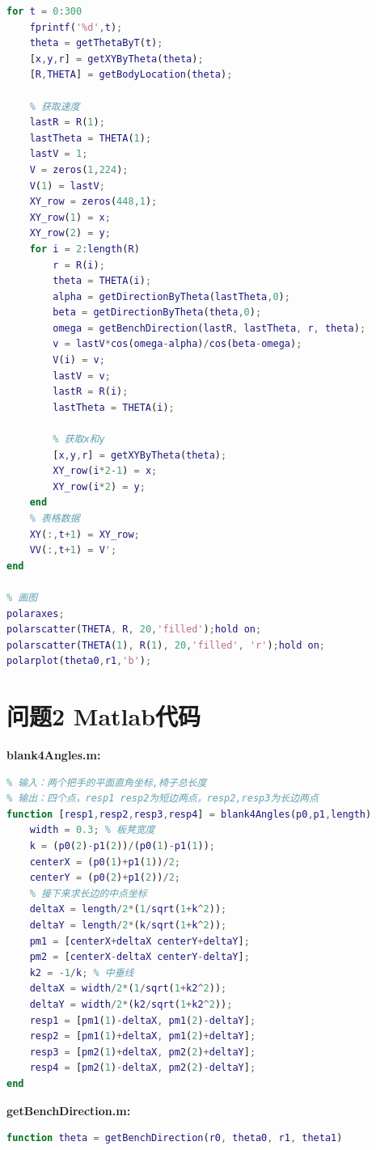 \documentclass[withoutpreface,bwprint]{cumcmthesis} %
\begin{document}
\begin{appendices}
\begin{lstlisting}[language=matlab]
for t = 0:300
    fprintf('%d',t);
    theta = getThetaByT(t);
    [x,y,r] = getXYByTheta(theta);
    [R,THETA] = getBodyLocation(theta);

    % 获取速度
    lastR = R(1);
    lastTheta = THETA(1);
    lastV = 1;
    V = zeros(1,224);
    V(1) = lastV;
    XY_row = zeros(448,1);
    XY_row(1) = x;
    XY_row(2) = y;
    for i = 2:length(R)
        r = R(i);
        theta = THETA(i);
        alpha = getDirectionByTheta(lastTheta,0);
        beta = getDirectionByTheta(theta,0);
        omega = getBenchDirection(lastR, lastTheta, r, theta);
        v = lastV*cos(omega-alpha)/cos(beta-omega);
        V(i) = v;
        lastV = v;
        lastR = R(i);
        lastTheta = THETA(i);
        
        % 获取x和y
        [x,y,r] = getXYByTheta(theta);
        XY_row(i*2-1) = x;
        XY_row(i*2) = y;
    end   
    % 表格数据
    XY(:,t+1) = XY_row;
    VV(:,t+1) = V';
end

% 画图
polaraxes;
polarscatter(THETA, R, 20,'filled');hold on;
polarscatter(THETA(1), R(1), 20,'filled', 'r');hold on;
polarplot(theta0,r1,'b');
\end{lstlisting}

\section{问题2 Matlab代码}
\noindent\textbf{\textcolor[rgb]{0.98,0.00,0.00}{blank4Angles.m:}}
\begin{lstlisting}[language=matlab]
% 根据两个把手的坐标（xy），获得四个角上点的坐标（xy）
% 输入：两个把手的平面直角坐标,椅子总长度
% 输出：四个点，resp1 resp2为短边两点，resp2,resp3为长边两点
function [resp1,resp2,resp3,resp4] = blank4Angles(p0,p1,length)
    width = 0.3; % 板凳宽度
    k = (p0(2)-p1(2))/(p0(1)-p1(1));
    centerX = (p0(1)+p1(1))/2;
    centerY = (p0(2)+p1(2))/2;
    % 接下来求长边的中点坐标
    deltaX = length/2*(1/sqrt(1+k^2));
    deltaY = length/2*(k/sqrt(1+k^2));
    pm1 = [centerX+deltaX centerY+deltaY];
    pm2 = [centerX-deltaX centerY-deltaY];
    k2 = -1/k; % 中垂线
    deltaX = width/2*(1/sqrt(1+k2^2));
    deltaY = width/2*(k2/sqrt(1+k2^2));
    resp1 = [pm1(1)-deltaX, pm1(2)-deltaY];
    resp2 = [pm1(1)+deltaX, pm1(2)+deltaY];
    resp3 = [pm2(1)+deltaX, pm2(2)+deltaY];
    resp4 = [pm2(1)-deltaX, pm2(2)-deltaY];
end
\end{lstlisting}
\noindent\textbf{\textcolor[rgb]{0.98,0.00,0.00}{getBenchDirection.m:}}
\begin{lstlisting}[language=matlab]
% 输入两个点的极坐标，输出两个点向量与x轴正方向的夹角，即板凳方向
function theta = getBenchDirection(r0, theta0, r1, theta1)


\end{lstlisting}
\end{appendices}
\end{document}
